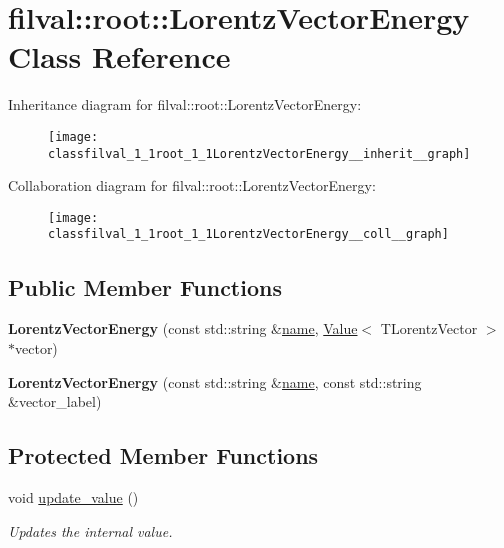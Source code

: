 \hypertarget{classfilval_1_1root_1_1LorentzVectorEnergy}{}\section{filval\+:\+:root\+:\+:Lorentz\+Vector\+Energy Class Reference}
\label{classfilval_1_1root_1_1LorentzVectorEnergy}


Inheritance diagram for filval\+:\+:root\+:\+:Lorentz\+Vector\+Energy\+:
\nopagebreak
\begin{figure}[H]
\begin{center}
\leavevmode
\texttt{[image: classfilval\_1\_1root\_1\_1LorentzVectorEnergy\_\_inherit\_\_graph]}
\end{center}
\end{figure}


Collaboration diagram for filval\+:\+:root\+:\+:Lorentz\+Vector\+Energy\+:
\nopagebreak
\begin{figure}[H]
\begin{center}
\leavevmode
\texttt{[image: classfilval\_1\_1root\_1\_1LorentzVectorEnergy\_\_coll\_\_graph]}
\end{center}
\end{figure}
\subsection*{Public Member Functions}
\begin{DoxyCompactItemize}
\item 
\hypertarget{classfilval_1_1root_1_1LorentzVectorEnergy_acfe297a0b051b0505fd6171706572b3b}{}\label{classfilval_1_1root_1_1LorentzVectorEnergy_acfe297a0b051b0505fd6171706572b3b} 
{\bfseries Lorentz\+Vector\+Energy} (const std\+::string \&\hyperlink{classfilval_1_1GenValue_a007e38c03ee041c2a657afa3d6e91ab1}{name}, \hyperlink{classfilval_1_1Value}{Value}$<$ T\+Lorentz\+Vector $>$ $\ast$vector)
\item 
\hypertarget{classfilval_1_1root_1_1LorentzVectorEnergy_a6f3ca1914702df817fa239d68d65a25f}{}\label{classfilval_1_1root_1_1LorentzVectorEnergy_a6f3ca1914702df817fa239d68d65a25f} 
{\bfseries Lorentz\+Vector\+Energy} (const std\+::string \&\hyperlink{classfilval_1_1GenValue_a007e38c03ee041c2a657afa3d6e91ab1}{name}, const std\+::string \&vector\+\_\+label)
\end{DoxyCompactItemize}
\subsection*{Protected Member Functions}
\begin{DoxyCompactItemize}
\item 
void \hyperlink{classfilval_1_1root_1_1LorentzVectorEnergy_acb8982a0909dbb00a5ff4c38047d5115}{update\+\_\+value} ()
\begin{DoxyCompactList}\small\item\em Updates the internal value. \end{DoxyCompactList}\end{DoxyCompactItemize}
